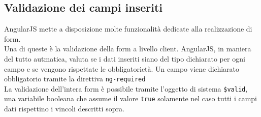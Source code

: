 \subsection{Validazione dei campi inseriti}

AngularJS mette a disposizione molte funzionalità dedicate alla realizzazione di form.\\
Una di queste è la validazione della form a livello client. AngularJS, in maniera del tutto autmatica, valuta se i dati inseriti siano del tipo dichiarato per ogni campo e se vengono rispettate le obbligatorietà. Un campo viene dichiarato obbligatorio tramite la direttiva \lstinline[language=HTML]!ng-required! \\
La validazione dell'intera form è possibile tramite l'oggetto di sistema \lstinline[language=HTML]!$valid!, una variabile booleana che assume il valore \lstinline[language=HTML]!true! solamente nel caso tutti i campi dati rispettino i vincoli descritti sopra.

\newpage
